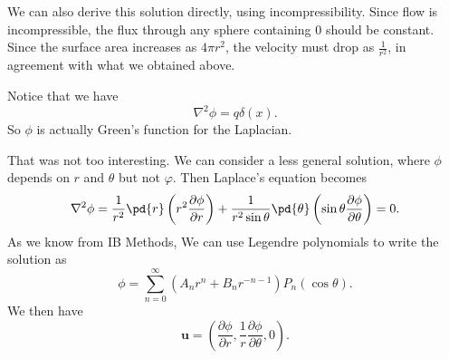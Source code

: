 \documentclass[a4paper]{article}
\begin{document}
We can also derive this solution directly, using incompressibility. Since flow is incompressible, the flux through any sphere containing $0$ should be constant. Since the surface area increases as $4\pi r^2$, the velocity must drop as $\frac{1}{r^2}$, in agreement with what we obtained above.

Notice that we have
\[
  \nabla^2 \phi = q \delta(x).
\]
So $\phi$ is actually Green's function for the Laplacian.

That was not too interesting. We can consider a less general solution, where $\phi$ depends on $r$ and $\theta$ but not $\varphi$. Then Laplace's equation becomes
\[
  \nabla^2 \phi = \frac{1}{r^2} \pd{r} \left(r^2 \frac{\partial \phi}{\partial r}\right) + \frac{1}{r^2 \sin \theta} \pd{\theta} \left(\sin \theta\frac{\partial \phi}{\partial \theta}\right) = 0.
\]
As we know from IB Methods, We can use Legendre polynomials to write the solution as
\[
  \phi = \sum_{n = 0}^\infty (A_n r^n + B_n r^{-n - 1})P_n(\cos \theta).
\]
We then have
\[
  \mathbf{u} =
  \left(\frac{\partial \phi}{\partial r}, \frac{1}{r}\frac{\partial \phi}{\partial \theta},0\right).
\]
\end{document}
